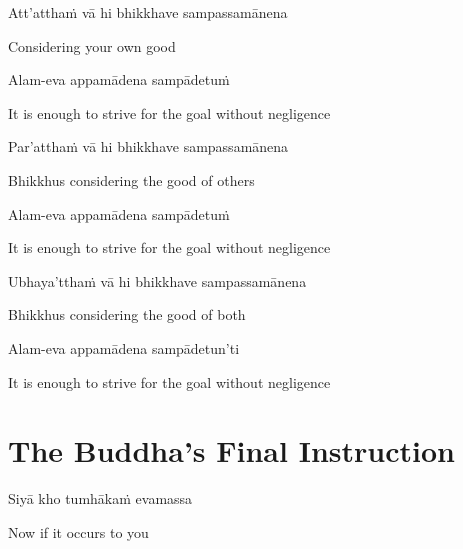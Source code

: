 Att’atthaṁ vā hi bhikkhave sampassamānena

\begin{cprenglish}
  Considering your own good
\end{cprenglish}

Alam-eva appamādena sampādetuṁ

\begin{cprenglish}
  It is enough to strive for the goal without negligence
\end{cprenglish}

Par’atthaṁ vā hi bhikkhave sampassamānena

\begin{cprenglish}
  Bhikkhus considering the good of others
\end{cprenglish}

Alam-eva appamādena sampādetuṁ

\begin{cprenglish}
  It is enough to strive for the goal without negligence
\end{cprenglish}

Ubhaya’tthaṁ vā hi bhikkhave sampassamānena

\begin{cprenglish}
  Bhikkhus considering the good of both
\end{cprenglish}

Alam-eva appamādena sampādetun'ti

\begin{cprenglish}
  It is enough to strive for the goal without negligence
\end{cprenglish}

\suttaRef{[SN 12.22]}

\clearpage

\section{The Buddha's Final Instruction}
\label{buddhas-final-instruction}

\begin{leader}
\end{leader}

Siyā kho tumhākaṁ evamassa

\begin{cprenglish}
  Now if it occurs to you
\end{cprenglish}

